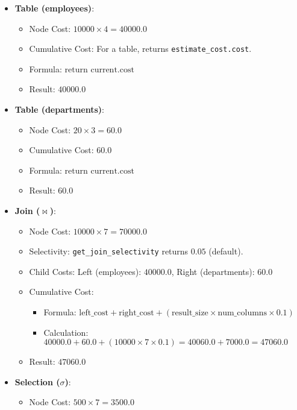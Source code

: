 \documentclass[12pt,a4paper]{article}
\begin{document}
\begin{itemize}
    \item \textbf{Table (employees)}:
        \begin{itemize}
            \item Node Cost: $10000 \times 4 = 40000.0$
            \item Cumulative Cost: For a table, returns \texttt{estimate\_cost.cost}.
            \item Formula: $\text{return current.cost}$
            \item Result: $40000.0$
        \end{itemize}
    \item \textbf{Table (departments)}:
        \begin{itemize}
            \item Node Cost: $20 \times 3 = 60.0$
            \item Cumulative Cost: $60.0$
            \item Formula: $\text{return current.cost}$
            \item Result: $60.0$
        \end{itemize}
    \item \textbf{Join ($\bowtie$)}:
        \begin{itemize}
            \item Node Cost: $10000 \times 7 = 70000.0$
            \item Selectivity: \texttt{get\_join\_selectivity} returns $0.05$ (default).
            \item Child Costs: Left (employees): $40000.0$, Right (departments): $60.0$
            \item Cumulative Cost:
                \begin{itemize}
                    \item Formula: $\text{left\_cost} + \text{right\_cost} + (\text{result\_size} \times \text{num\_columns} \times 0.1)$
                    \item Calculation: $40000.0 + 60.0 + (10000 \times 7 \times 0.1) = 40060.0 + 7000.0 = 47060.0$
                \end{itemize}
            \item Result: $47060.0$
        \end{itemize}
    \item \textbf{Selection ($\sigma$)}:
        \begin{itemize}
            \item Node Cost: $500 \times 7 = 3500.0$

\end{itemize}
\end{itemize}
\end{document}
